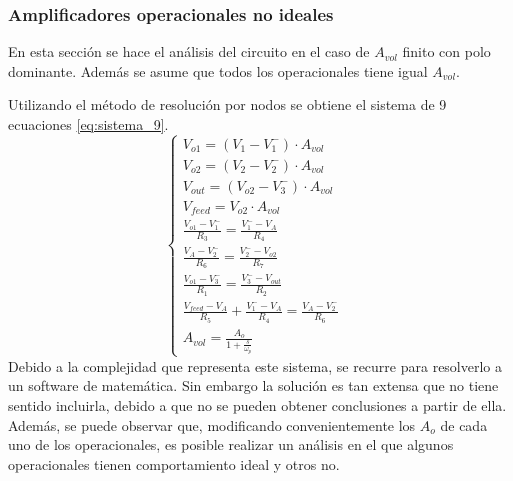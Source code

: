 \subsubsection{Amplificadores operacionales no ideales }
En esta secci\'on se hace el an\'alisis del circuito en el caso de $A_{vol}$ finito con polo dominante. Adem\'as se asume que todos los operacionales tiene igual $A_{vol}$.

Utilizando el m\'etodo de resoluci\'on por nodos se obtiene el sistema de 9 ecuaciones \ref{eq:sistema_9}.
\begin{equation}
    \left\{
        \begin{array}{lllllllll}
            
            V_{o1} = (V_1-V_1^-)\cdot A_{vol} &\\
            
            V_{o2} = (V_2-V_2^-)\cdot A_{vol}\\
            
            V_{out} = (V_{o2}-V_3^-)\cdot A_{vol}\\
            
            V_{feed} = V_{o2}\cdot A_{vol}\\

            \frac{V_{o1}-V_1^-}{R_3} = \frac{V_1^- - V_A}{R_4}\\

            \frac{V_{A}-V_2^-}{R_6} = \frac{V_2^- - V_{o2}}{R_7}\\

            \frac{V_{o1}-V_3^-}{R_1} = \frac{V_3^- - V_{out}}{R_2}\\

            \frac{V_{feed}-V_A}{R_5} + \frac{V_1^- - V_A}{R_4}= \frac{V_A - V_2^-}{R_6}\\

            A_{vol} = \frac{A_o}{1+\frac{s}{\omega_p}}
        \end{array}
    \right.
\label{eq:sistema_9}
\end{equation}
Debido a la complejidad que representa este sistema, se recurre para resolverlo a un software de matem\'atica.
Sin embargo la soluci\'on es tan extensa que no tiene sentido incluirla, debido a que no se pueden obtener conclusiones a partir de ella.
Adem\'as, se puede observar que, modificando convenientemente los $A_o$ de cada uno de los operacionales, es posible realizar un an\'alisis en el que algunos operacionales tienen comportamiento ideal y otros no. 


